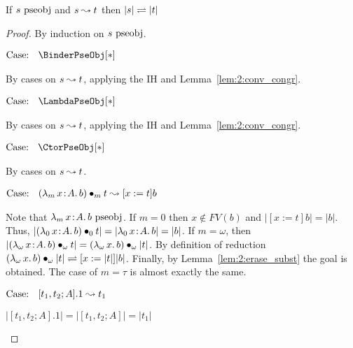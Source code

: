 \begin{lemma}
    \label{lem:2:erase_pseobj_red}
    If $s~\textnormal{pseobj}$ and $s \leadsto t$ then $|s| \rightleftharpoons |t|$
\end{lemma}
\begin{proof}
    By induction on $s~\textnormal{pseobj}$.

    $\text{Case: }\begin{array}{c} \BinderPseObj[*] \end{array}$
    \begin{proofcase}
        By cases on $s \leadsto t$, applying the IH and Lemma~\ref{lem:2:conv_congr}.
    \end{proofcase}

    $\text{Case: }\begin{array}{c} \LambdaPseObj[*] \end{array}$
    \begin{proofcase}
        By cases on $s \leadsto t$, applying the IH and Lemma~\ref{lem:2:conv_congr}.
    \end{proofcase}

    $\text{Case: }\begin{array}{c} \CtorPseObj[*] \end{array}$
    \begin{proofcase}
        By cases on $s \leadsto t$.

        $\text{Case: }\begin{array}{c} ({\lambda_m}\, x\! : \! A.\, b) \bullet_{m} t \leadsto [x := t]b \end{array}$
        \begin{proofcase}
            Note that ${\lambda_m}\, x\! : \! A.\, b~\textnormal{pseobj}$.
            If $m = 0$ then $x \notin FV(b)$ and $|[x := t]b| = |b|$.
            Thus, $|({\lambda_0}\, x\! : \! A.\, b) \bullet_{0} t| = |{\lambda_0}\, x\! : \! A.\, b| = |b|$.
            If $m = \omega$, then $|({\lambda_\omega}\, x\! : \! A.\, b) \bullet_{\omega} t| = ({\lambda_\omega}\, x.\, b) \bullet_{\omega} |t|$.
            By definition of reduction $({\lambda_\omega}\, x.\, b) \bullet_{\omega} |t| \rightleftharpoons [x := |t|]|b|$.
            Finally, by Lemma~\ref{lem:2:erase_subst} the goal is obtained.
            The case of $m = \tau$ is almost exactly the same.
        \end{proofcase}

        $\text{Case: }\begin{array}{c} [t_1, t_2; A].1 \leadsto t_1 \end{array}$
        \begin{proofcase}
            $|[t_1, t_2; A].1| = |[t_1, t_2; A]| = |t_1|$
        \end{proofcase}


\end{proofcase}
\end{proof}
